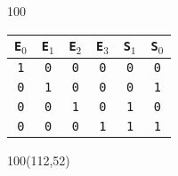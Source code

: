 \documentclass[aspectratio=169]{beamer}
\begin{document}
\begin{frame}[fragile]
\begin{textblock}{100}
{\begin{tabular}{|cccc|cc|}
    \small\texttt{E$_0$} & \small\texttt{E$_1$} & \small\texttt{E$_2$} & \small\texttt{E$_3$} & \small\texttt{S$_1$} & \small\texttt{S$_0$} \\ \hline
    \small\texttt{1}     & \small\texttt{0}     & \small\texttt{0}     & \small\texttt{0}     & \small\texttt{0}     & \small\texttt{0} \\
    \small\texttt{0}     & \small\texttt{1}     & \small\texttt{0}     & \small\texttt{0}     & \small\texttt{0}     & \small\texttt{1} \\
    \small\texttt{0}     & \small\texttt{0}     & \small\texttt{1}     & \small\texttt{0}     & \small\texttt{1}     & \small\texttt{0} \\
    \small\texttt{0}     & \small\texttt{0}     & \small\texttt{0}     & \small\texttt{1}     & \small\texttt{1}     & \small\texttt{1} \\ \hline
    \end{tabular} }
    \end{textblock}
    \begin{textblock}{100}(112,52)   \end{textblock}
\end{frame}
\end{document}
